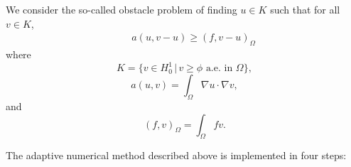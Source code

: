 \documentclass{article}
\begin{document}
We consider the so-called obstacle  problem of finding $u \in K$ such that for all $v \in
K$, 
\begin{align}
&\quad  a(u,v-u)\geq (f,v-u)_{\Omega}   \label{eq:ob-prob}
\end{align}
where
\begin{equation}
  \label{eq:admiss-set}
  K=\{v\in H_0^1\,|\, v\geq \phi \text{ a.e. in }\Omega\},
\end{equation}
\begin{equation}
  a(u,v)=\int_\Omega \nabla u \cdot \nabla v, 
\end{equation}
and 
\begin{equation}
  (f,v)_\Omega=\int_\Omega fv.
\end{equation}

The adaptive numerical method described above is implemented in four steps:
\end{document}
